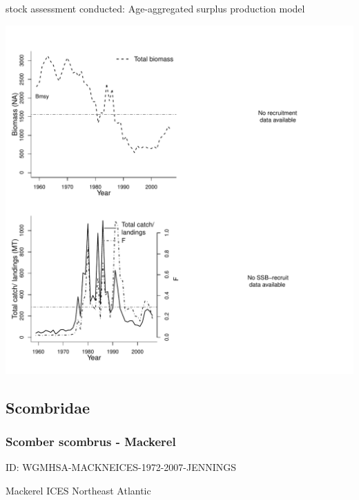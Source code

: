 stock assessment conducted: Age-aggregated surplus production model 
\begin{center}
\vspace{-0.2cm}\includegraphics[scale=0.65]{../tex/figures/plot-RIDEM-TAUTOGRI-1959-2007-COLLIE.pdf}
\end{center}

\newpage
\subsection{Scombridae}

\subsubsection{Scomber scombrus - Mackerel}
ID: WGMHSA-MACKNEICES-1972-2007-JENNINGS

Mackerel ICES Northeast Atlantic 

